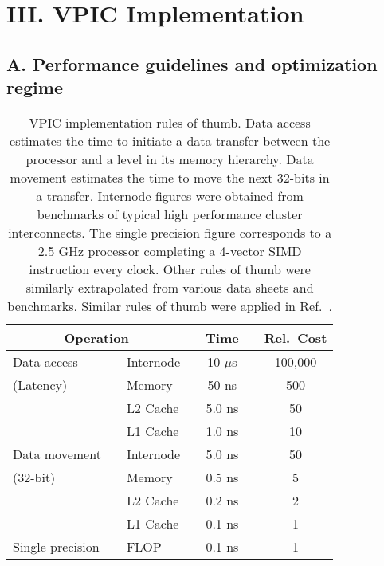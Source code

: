 \documentclass[letter,10pt]{article}
\begin{document}
\section{III. VPIC Implementation}

\subsection{A. Performance guidelines and optimization regime}

\begin{table}
\caption{\label{tbl:Rules_of_thumb}
VPIC implementation rules of thumb.  Data access estimates the time to
initiate a data transfer between the processor and a level in its
memory hierarchy.  Data movement estimates the time to move the next
32-bits in a transfer.  Internode figures were obtained from
benchmarks of typical high performance cluster interconnects.  The
single precision figure corresponds to a 2.5 GHz processor completing
a 4-vector SIMD instruction every clock.  Other rules of thumb were
similarly extrapolated from various data sheets and benchmarks.
Similar rules of thumb were applied in Ref.~\cite{Bowers_et_al_2006}.}
\begin{tabular}{l l l c c c c}
\hline
\hline
\multicolumn{3}{c}{Operation} & \hspace{18pt} & Time & \hspace{18pt} & Rel.~Cost \\
\hline
Data access      & \hspace{9pt} & Internode & & 10 $\mu$s & & 100,000 \\
(Latency)        & & Memory    & & 50 ns     & & 500     \\
                 & & L2 Cache  & & 5.0 ns    & & 50      \\
\vspace{4pt}     & & L1 Cache  & & 1.0 ns    & & 10      \\
Data movement    & & Internode & & 5.0 ns    & & 50      \\
(32-bit)         & & Memory    & & 0.5 ns    & & 5       \\
                 & & L2 Cache  & & 0.2 ns    & & 2       \\
\vspace{4pt}     & & L1 Cache  & & 0.1 ns    & & 1       \\
Single precision & & FLOP      & & 0.1 ns    & & 1       \\
\hline
\hline
\end{tabular}
\end{table}
\end{document}
